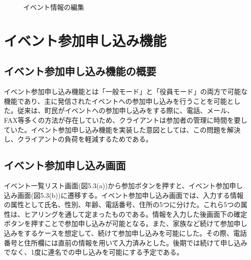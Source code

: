 \begin{figure}[htbp]
\begin{center}
\begin{tabular}{c}
    \end{tabular}
    \caption{イベント情報の編集}
    \label{fig:lena}
  \end{center}
\end{figure}

\section{イベント参加申し込み機能}%
\subsection{イベント参加申し込み機能の概要}%
イベント参加申し込み機能とは「一般モード」と「役員モード」の両方で可能な機能であり、主に発信されたイベントへの参加申し込みを行うことを可能とした。従来は、町民がイベントへの参加申し込みをする際に、電話、メール、FAX等多くの方法が存在していため、クライアントは参加者の管理に時間を要していた。イベント参加申し込み機能を実装した意図としては、この問題を解決し、クライアントの負荷を軽減するためである。

\subsection{イベント参加申し込み画面}%
イベント一覧リスト画面(図5.3(a))から参加ボタンを押すと、イベント参加申し込み画面(図5.3(b))に遷移する。イベント参加申し込み画面では、入力する情報の属性として氏名、性別、年齢、電話番号、住所の5つに分けた。これら5つの属性は、ヒアリングを通して定まったものである。情報を入力した後画面下の確定ボタンを押すことで参加申し込みが可能となる。また、家族など続けて参加申し込みをするケースを想定して、続けて参加申し込みを可能にした。その際、電話番号と住所欄には直前の情報を用いて入力済みとした。後期では続けて申し込みでなく、1度に連名での申し込みを可能にする予定である。

